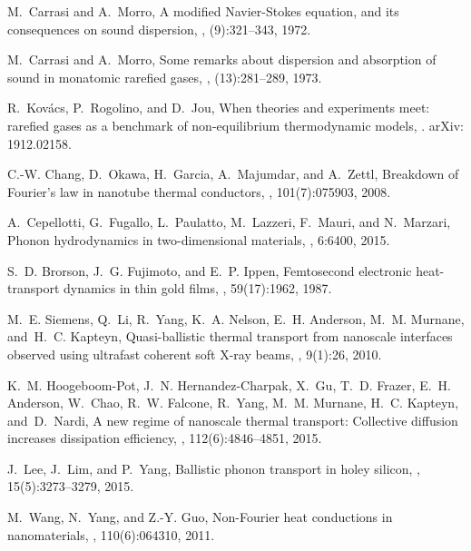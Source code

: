 \documentclass[sn-mathphys]{sn-jnl}%
\theoremstyle{thmstyleone}%
\theoremstyle{thmstyletwo}%
\theoremstyle{thmstylethree}%
\begin{document}
\begin{thebibliography}{9}
	M.~Carrasi and A.~Morro,
	\newblock A modified {N}avier-{S}tokes equation, and its consequences on sound
	dispersion,
	, (9):321--343, 1972.
	
	M.~Carrasi and A.~Morro,
	\newblock Some remarks about dispersion and absorption of sound in monatomic
	rarefied gases,
	, (13):281--289, 1973.
	
	R.~Kov\'acs, P.~Rogolino, and D.~Jou,
	\newblock When theories and experiments meet: rarefied gases as a benchmark of
	non-equilibrium thermodynamic models,
	.
	\newblock arXiv: 1912.02158.
	
	C.-W. Chang, D.~Okawa, H.~Garcia, A.~Majumdar, and A.~Zettl,
	\newblock Breakdown of {F}ourier's law in nanotube thermal conductors,
	, 101(7):075903, 2008.
	
	A.~Cepellotti, G.~Fugallo, L.~Paulatto, M.~Lazzeri, F.~Mauri, and N.~Marzari,
	\newblock Phonon hydrodynamics in two-dimensional materials,
	, 6:6400, 2015.
	
	S.~D. Brorson, J.~G. Fujimoto, and E.~P. Ippen,
	\newblock Femtosecond electronic heat-transport dynamics in thin gold films,
	, 59(17):1962, 1987.
	
	M.~E. Siemens, Q.~Li, R.~Yang, K.~A. Nelson, E.~H. Anderson, M.~M. Murnane, and H.~C. Kapteyn,
	\newblock Quasi-ballistic thermal transport from nanoscale interfaces observed
	using ultrafast coherent soft {X}-ray beams,
	, 9(1):26, 2010.
	
	K.~M. Hoogeboom-Pot, J.~N. Hernandez-Charpak, X.~Gu, T.~D. Frazer, E.~H.
	Anderson, W.~Chao, R.~W. Falcone, R.~Yang, M.~M. Murnane, H.~C. Kapteyn, and D.~Nardi,
	\newblock A new regime of nanoscale thermal transport: Collective diffusion
	increases dissipation efficiency,
	, 112(6):4846--4851, 2015.
	
	J.~Lee, J.~Lim, and P.~Yang,
	\newblock Ballistic phonon transport in holey silicon,
	, 15(5):3273--3279, 2015.
	
	M.~Wang, N.~Yang, and Z.-Y. Guo,
	\newblock Non-{F}ourier heat conductions in nanomaterials,
	, 110(6):064310, 2011.
	

\end{thebibliography}
\end{document}
